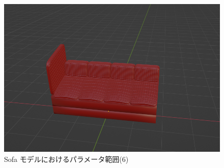 \begin{figure}[h]
\begin{minipage}[b]{0.48\linewidth}
  \includegraphics[scale=0.17]{./imgs/sofaParamMean/bevelMax.png}
 \end{minipage}
 \caption{Sofa モデルにおけるパラメータ範囲(6)}\label{fig:sofaParamMean_6}
\end{figure}



